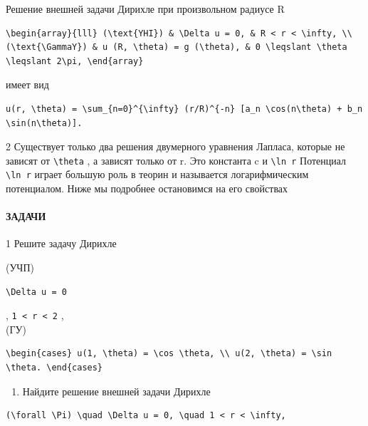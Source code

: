 \documentclass[
  ukrainian,
]{article}
\providecommand{\tightlist}{%
  \setlength{\itemsep}{0pt}\setlength{\parskip}{0pt}}
\begin{document}
Решение внешней задачи Дирихле при произвольном радиусе R

\begin{verbatim}
\begin{array}{lll} (\text{YHI}) & \Delta u = 0, & R < r < \infty, \\ (\text{\GammaY}) & u (R, \theta) = g (\theta), & 0 \leqslant \theta \leqslant 2\pi, \end{array}
\end{verbatim}

имеет вид

\begin{verbatim}
u(r, \theta) = \sum_{n=0}^{\infty} (r/R)^{-n} [a_n \cos(n\theta) + b_n \sin(n\theta)].
\end{verbatim}

2 Существует только два решения двумерного уравнения Лапласа, которые не
зависят от \texttt{\textbackslash{}theta} , а зависят только от r. Это
константа c и \texttt{\textbackslash{}ln\ r} Потенциал
\texttt{\textbackslash{}ln\ r} играет большую роль в теорин и называется
логарифмическим потенциалом. Ниже мы подробнее остановимся на его
свойствах

\paragraph{ЗАДАЧИ}\label{ux437ux430ux434ux430ux447ux438-9}

1 Решите задачу Дирихле

(УЧП)

\begin{verbatim}
\Delta u = 0
\end{verbatim}

, \texttt{1\ \textless{}\ r\ \textless{}\ 2} ,\\
(ГУ)

\begin{verbatim}
\begin{cases} u(1, \theta) = \cos \theta, \\ u(2, \theta) = \sin \theta. \end{cases}
\end{verbatim}

\begin{enumerate}
\def\labelenumi{\arabic{enumi}.}
\setcounter{enumi}{1}
\tightlist
\item
  Найдите решение внешней задачи Дирихле
\end{enumerate}

\begin{verbatim}
(\forall \Pi) \quad \Delta u = 0, \quad 1 < r < \infty,
\end{verbatim}
\end{document}
